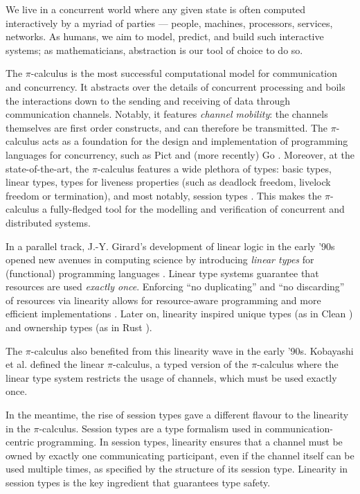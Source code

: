 \documentclass[a4paper,UKenglish,cleveref, autoref, thm-restate,authorcolumns]{lipics-v2019}
\theoremstyle{definition}
\newcommand{\picalc}{$\pi$-calculus}
\begin{document}

We live in a concurrent world where any given state is often computed interactively by a myriad of parties --- people, machines, processors, services, networks.
As humans, we aim to model, predict, and build such interactive systems; as mathematicians, abstraction is our tool of choice to do so.

The \picalc{} \cite{MilnerPW92,Milner99} is the most successful computational model for communication and concurrency.
It abstracts over the details of concurrent processing and boils the interactions down to the sending and receiving of data through communication channels.
Notably, it features \emph{channel mobility}: the channels themselves are first order constructs, and can therefore be transmitted.
The \picalc{} acts as a foundation for the design and implementation of programming languages for concurrency, such as Pict \cite{Pierce} and (more recently) Go \cite{Golang}.
Moreover, at the state-of-the-art, the \picalc{} features a wide plethora of types: basic types, linear types, types for liveness properties (such as deadlock freedom, livelock freedom or termination), and most notably, session types \cite{K07}. This makes the \picalc{} a fully-fledged tool for the modelling and verification of concurrent and distributed systems.

In a parallel track, J.-Y. Girard's development of linear logic \cite{Girard87} in the early '90s opened new avenues in computing science by introducing \emph{linear types} for (functional) programming languages \cite{Curry-Howard,Wadler90,Bernardy2018}.
Linear type systems guarantee that resources are used \emph{exactly once}.
Enforcing ``no duplicating'' and ``no discarding'' of resources via linearity allows for resource-aware programming and more efficient implementations \cite{Wadler90}.
Later on, linearity inspired unique types (as in Clean \cite{BarendsenS96}) and ownership types (as in Rust \cite{MatsakisK14}).

The \picalc{} also benefited from this linearity wave in the early '90s.
Kobayashi et al. \cite{KPT96} defined the {linear} \picalc{}, a typed version of the \picalc{} where the linear type system restricts the usage of channels, which must be used exactly once.

In the meantime, the rise of session types \cite{H93,THK94,HVK98} gave a different flavour to the linearity in the \picalc{}.
Session types are a type formalism used in communication-centric programming.
In session types, linearity ensures that a channel must be owned by exactly one communicating participant, even if the channel itself can be used multiple times, as specified by the structure of its session type.
Linearity in session types is the key ingredient that guarantees type safety.
\end{document}
